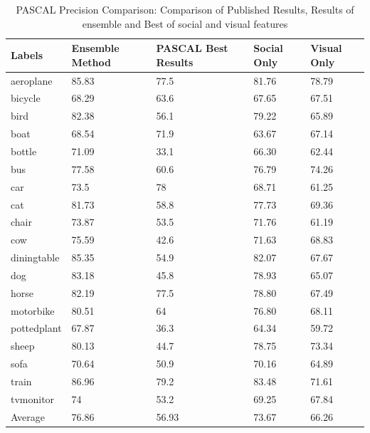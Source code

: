 \begin{table}
\centering
\caption{ PASCAL Precision Comparison: Comparison of Published Results, Results of ensemble and Best of social and visual features} %
\vspace*{0.2 cm}
\begin{tabular}{| p{1.7cm}| p{1.5cm}|p{1.2cm}|p{1.2cm}|p{1.2cm}|} \hline
 Labels & Ensemble Method & PASCAL Best Results & Social Only & Visual Only  \\  [1ex] \hline
aeroplane & 85.83 & 77.5 & 81.76 & 78.79 \\  [1ex] \hline
bicycle & 68.29 & 63.6 & 67.65 & 67.51 \\  [1ex] \hline
bird & 82.38 & 56.1 & 79.22 & 65.89 \\  [1ex] \hline
boat & 68.54 & 71.9 & 63.67 & 67.14 \\  [1ex] \hline
bottle & 71.09 & 33.1 & 66.30 & 62.44 \\  [1ex] \hline
bus & 77.58 & 60.6 & 76.79 & 74.26 \\  [1ex] \hline
car & 73.5 & 78 & 68.71 & 61.25 \\  [1ex] \hline
cat & 81.73 & 58.8 & 77.73 & 69.36 \\  [1ex] \hline
chair & 73.87 & 53.5 & 71.76 & 61.19 \\  [1ex] \hline
cow & 75.59 & 42.6 & 71.63 & 68.83 \\  [1ex] \hline
diningtable & 85.35 & 54.9 & 82.07 & 67.67 \\  [1ex] \hline
dog & 83.18 & 45.8 & 78.93 & 65.07 \\  [1ex] \hline
horse & 82.19 & 77.5 & 78.80 & 67.49 \\  [1ex] \hline
motorbike & 80.51 & 64 & 76.80 & 68.11 \\  [1ex] \hline
pottedplant & 67.87 & 36.3 & 64.34 & 59.72 \\  [1ex] \hline
sheep & 80.13 & 44.7 & 78.75 & 73.34 \\  [1ex] \hline
sofa & 70.64 & 50.9 & 70.16 & 64.89 \\  [1ex] \hline
train & 86.96 & 79.2 & 83.48 & 71.61 \\  [1ex] \hline
tvmonitor & 74 & 53.2 & 69.25 & 67.84 \\  [1ex] \hline
Average & 76.86 & 56.93 & 73.67 & 66.26 \\  [1ex] \hline
\end{tabular}
 \label{PASCALPrecisionOverAll} %
\end{table}

